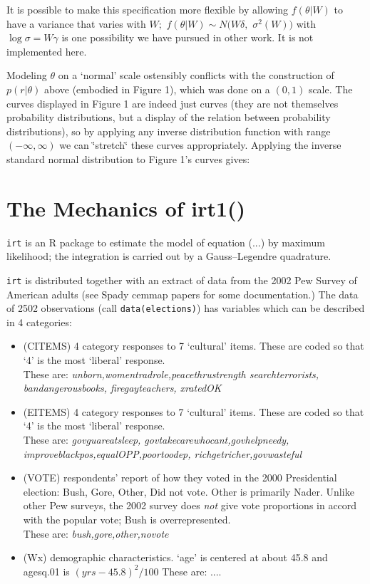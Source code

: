 \documentclass{amsart}
\newcommand{\Rpackage}[1]{{\texttt{#1}}}
\newcommand{\R}{{\normalfont\textsf{R }}{}}
\begin{document}
It is possible to make this specification more flexible by allowing
$f(\theta|W)$ to have a variance that varies with $W;$ $f(\theta|W)\sim N(W\delta,$
$\sigma^{2}(W))$ with $\log\sigma=W\gamma$ is one possibility we
have pursued in other work. It is not implemented here.

Modeling $\theta$ on a `normal' scale ostensibly conflicts with the
construction of $p(r|\theta)$ above (embodied in Figure 1), which
was done on a $(0,1)$ scale. The curves displayed in Figure 1 are
indeed just curves (they are not themselves probability distributions,
but a display of the relation between probability distributions),
so by applying any inverse distribution function with range $(-\infty,\infty)$
we can \char`\"{}stretch\char`\"{} these curves appropriately. Applying
the inverse standard normal distribution to Figure 1's curves gives:

\section{The Mechanics of irt1()} 

\Rpackage{irt} is an \R package to estimate the model of equation (...)
by maximum likelihood; the integration is carried out by a Gauss--Legendre
quadrature.

\Rpackage{irt} is distributed together with an extract of data from the 2002
Pew Survey of American adults (see Spady cemmap papers for some documentation.)
The data of 2502 observations (call {\tt data(elections)}) has variables which can be described in 4 categories:

\begin{itemize}
\item (CITEMS) 4 category responses to 7 `cultural' items. 
These are coded so that `4' is the most `liberal' response.\\
These are: {\it unborn,womentradrole,peacethrustrength
 searchterrorists, bandangerousbooks, firegayteachers, xratedOK}

\item (EITEMS) 4 category responses to 7 `cultural' items.  
These are coded so that `4' is the most `liberal' response.\\
These are: {\it govguareatsleep, govtakecarewhocant,govhelpneedy, improveblackpos,equalOPP,poortoodep,       
richgetricher,govwasteful}
\item (VOTE) respondents' report of how they voted
in the 2000 Presidential election: Bush, Gore, Other, Did not vote.
Other is primarily Nader. Unlike other Pew surveys, the 2002 survey
does \emph{not} give vote proportions in accord with the popular vote;
Bush is overrepresented.\\
These are: {\it bush,gore,other,novote}

\item (Wx) demographic characteristics. `age' is centered at about 45.8 and
agesq.01 is $(yrs-45.8)^{2}/100$
These are: ....
\end{itemize}
\end{document}
